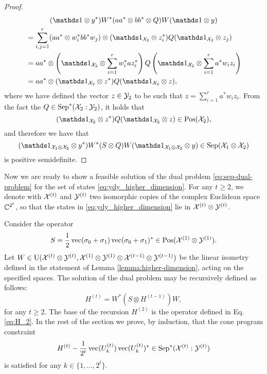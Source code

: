 \begin{proof}
\begin{multline}
  (\I\otimes y^{\ast})W^{\ast}(aa^{\ast}\otimes bb^{\ast} \otimes Q)W(\I\otimes y)\\
\begin{aligned}
  &= \sum_{i,j=1}^{r}(aa^{\ast}\otimes w_{i}^{\ast}bb^{\ast}w_{j})\otimes(\I_{\X_{2}} \otimes z_{i}^{\ast})Q(\I_{\X_{2}} \otimes z_{j})\\
  &= aa^{\ast} \otimes \left(\I_{\X_{2}}\otimes\sum_{i=1}^{r}
        w_{i}^{\ast} a z_{i}^{\ast}\right)Q
        \left(\I_{\X_{2}}\otimes\sum_{i=1}^{r} a^{\ast}w_{i}z_{i}\right) \\
  &= aa^{\ast} \otimes (\I_{\X_{2}}\otimes z^{\ast})Q
        (\I_{\X_{2}}\otimes z),
\end{aligned}
\end{multline}
where we have defined the vector $z \in \mathcal{Y}_{2}$ to be such that 
$z = \sum_{i=1}^{r} a^{\ast}w_{i}z_{i}$.
From the fact the $Q \in \mathrm{Sep}^{\ast}(\mathcal{X}_{2}:\mathcal{Y}_{2})$, it holds that 
\[
  (\I_{\X_{2}}\otimes z^{\ast})Q(\I_{\X_{2}}\otimes z) \in \Pos(\X_{2}),
\] 
and therefore we have that
\begin{equation}
  (\I_{\X_{1}\otimes\X_{2}} \otimes y^{\ast})W^{\ast}
    (S \otimes Q)W
    (\I_{\X_{1}\otimes\X_{2}} \otimes y) \in \Sep(\X_{1}\otimes\X_{2})
\end{equation}
is positive semidefinite.
\end{proof}

Now we are ready to show a feasible solution of the dual problem \eqref{eq:sep-dual-problem}
for the set of states \eqref{eq:ydy_higher_dimension}.
For any $t \geq 2$, we denote with $\mathcal{X}^{(t)}$ and $\mathcal{Y}^{(t)}$ two isomorphic 
copies of the complex Euclidean space $\mathbb{C}^{2^{t}}$, 
so that the states in \eqref{eq:ydy_higher_dimension} lie in $\mathcal{X}^{(t)}\otimes\mathcal{Y}^{(t)}$.

Consider the operator
\begin{equation}
  S = \frac{1}{2}\operatorname{vec}(\sigma_{0} + \sigma_{1})\operatorname{vec}(\sigma_{0} + \sigma_{1})^{\ast} 
    \in \mathrm{Pos}(\mathcal{X}^{(1)}\otimes\mathcal{Y}^{(1)}).
\end{equation}
Let $W \in \mathrm{U}(\mathcal{X}^{(t)}\otimes\mathcal{Y}^{(t)},\mathcal{X}^{(1)}\otimes\mathcal{Y}^{(1)}\otimes\mathcal{X}^{(t-1)}\otimes\mathcal{Y}^{(t-1)})$ 
be the linear isometry defined in the statement of Lemma \ref{lemma:higher-dimension},
acting on the specified spaces.
The solution of the dual problem may be recursively defined as follows: 
\begin{equation}
  H^{(t)} = W^{\ast}(S \otimes H^{(t-1)})W,
\end{equation}
for any $t \geq 2$. The base of the 
recursion $H^{(2)}$ is the operator defined in Eq. \eqref{eq:H_2}.
In the rest of the section we prove, by induction, that the cone program constraint
\begin{equation}
\label{eq:condiction_Ht}
  H^{(t)} - \frac{1}{2^{t}}\operatorname{vec}(U_{k}^{(t)})\operatorname{vec}(U_{k}^{(t)})^{\ast} 
      \in \mathrm{Sep}^{\ast}(\mathcal{X}^{(t)}:\mathcal{Y}^{(t)})
\end{equation}
is satisfied for any $k \in \{1, \ldots, 2^{t} \}$. 


